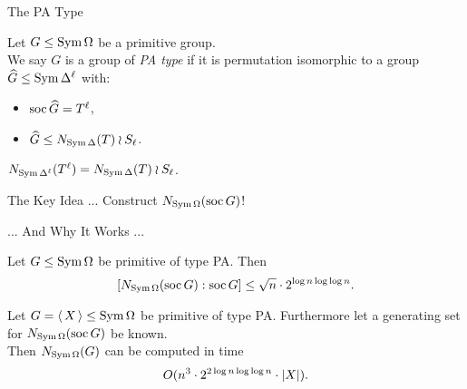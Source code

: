 
\begin{frame}{The PA Type}
    \begin{defn}
        Let $G \leq \operatorname{Sym} \Omega$ be a primitive group.
        \\
        We say $G$ is a group of \emph{PA type} if it is permutation
        isomorphic to a group $\widehat{G} \leq \operatorname{Sym} \Delta ^ \ell$ with:
        \vspace{-0.5em}
        \pause
        \begin{itemize}
            \item
            $\operatorname{soc} \widehat{G} = T ^ \ell$,
            \pause
            \item
            $\widehat{G} \leq N_{\operatorname{Sym} \Delta}(T) \wr S_\ell$.
        \end{itemize}
    \end{defn}
    \pause

    \begin{lemma}
        $N_{\operatorname{Sym} \Delta ^ \ell}( T ^ \ell ) = N_{\operatorname{Sym} \Delta}(T) \wr S_\ell$.
    \end{lemma}
\end{frame}


\begin{frame}{The Key Idea ...}
    \centering
    {\Large
    Construct $N_{\operatorname{Sym} \Omega}(\operatorname{soc} G)$!
    }
\end{frame}

\begin{frame}{... And Why It Works ...}
    \begin{lemma}
        Let $G \leq \operatorname{Sym} \Omega$ be primitive of type PA.
        Then
        \vspace{-0.5em}
        \[
            [ N_{\operatorname{Sym} \Omega}(\operatorname{soc} G) : \operatorname{soc} G ]
            \leq \sqrt n \cdot 2 ^ {\log n \log \log n}.
        \]
    \end{lemma}
    \pause

    \begin{lemma}
        Let $G =  \left\langle \, X \, \right\rangle  \leq \operatorname{Sym} \Omega$ be primitive of type PA.
        Furthermore let a generating set for
        $N_{\operatorname{Sym} \Omega}(\operatorname{soc} G)$ be known.
        \\
        \pause
        Then $N_{\operatorname{Sym} \Omega}(G)$ can be computed in time
        \vspace{-0.5em}
        \[
            O(n ^ 3 \cdot 2 ^ {2 \log n \log \log n} \cdot  \left| X \right| ).
        \]
    \end{lemma}
\end{frame}

